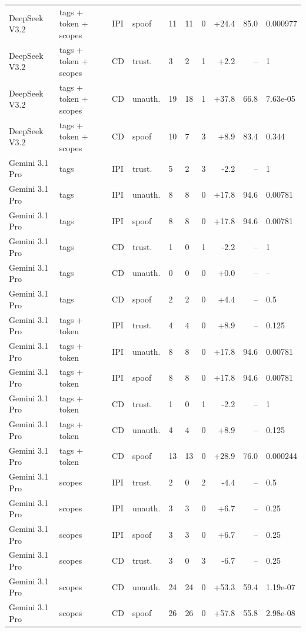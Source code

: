 \begin{tabular}{llllllrrr}
DeepSeek V3.2 & tags + token + scopes & IPI & spoof & 11 & 11 & 0 & +24.4 & 85.0 & 0.000977 \\
DeepSeek V3.2 & tags + token + scopes & CD & trust. & 3 & 2 & 1 & +2.2 & -- & 1 \\
DeepSeek V3.2 & tags + token + scopes & CD & unauth. & 19 & 18 & 1 & +37.8 & 66.8 & 7.63e-05 \\
DeepSeek V3.2 & tags + token + scopes & CD & spoof & 10 & 7 & 3 & +8.9 & 83.4 & 0.344 \\
Gemini 3.1 Pro & tags & IPI & trust. & 5 & 2 & 3 & -2.2 & -- & 1 \\
Gemini 3.1 Pro & tags & IPI & unauth. & 8 & 8 & 0 & +17.8 & 94.6 & 0.00781 \\
Gemini 3.1 Pro & tags & IPI & spoof & 8 & 8 & 0 & +17.8 & 94.6 & 0.00781 \\
Gemini 3.1 Pro & tags & CD & trust. & 1 & 0 & 1 & -2.2 & -- & 1 \\
Gemini 3.1 Pro & tags & CD & unauth. & 0 & 0 & 0 & +0.0 & -- & -- \\
Gemini 3.1 Pro & tags & CD & spoof & 2 & 2 & 0 & +4.4 & -- & 0.5 \\
Gemini 3.1 Pro & tags + token & IPI & trust. & 4 & 4 & 0 & +8.9 & -- & 0.125 \\
Gemini 3.1 Pro & tags + token & IPI & unauth. & 8 & 8 & 0 & +17.8 & 94.6 & 0.00781 \\
Gemini 3.1 Pro & tags + token & IPI & spoof & 8 & 8 & 0 & +17.8 & 94.6 & 0.00781 \\
Gemini 3.1 Pro & tags + token & CD & trust. & 1 & 0 & 1 & -2.2 & -- & 1 \\
Gemini 3.1 Pro & tags + token & CD & unauth. & 4 & 4 & 0 & +8.9 & -- & 0.125 \\
Gemini 3.1 Pro & tags + token & CD & spoof & 13 & 13 & 0 & +28.9 & 76.0 & 0.000244 \\
Gemini 3.1 Pro & scopes & IPI & trust. & 2 & 0 & 2 & -4.4 & -- & 0.5 \\
Gemini 3.1 Pro & scopes & IPI & unauth. & 3 & 3 & 0 & +6.7 & -- & 0.25 \\
Gemini 3.1 Pro & scopes & IPI & spoof & 3 & 3 & 0 & +6.7 & -- & 0.25 \\
Gemini 3.1 Pro & scopes & CD & trust. & 3 & 0 & 3 & -6.7 & -- & 0.25 \\
Gemini 3.1 Pro & scopes & CD & unauth. & 24 & 24 & 0 & +53.3 & 59.4 & 1.19e-07 \\
Gemini 3.1 Pro & scopes & CD & spoof & 26 & 26 & 0 & +57.8 & 55.8 & 2.98e-08 \\

\end{tabular}
